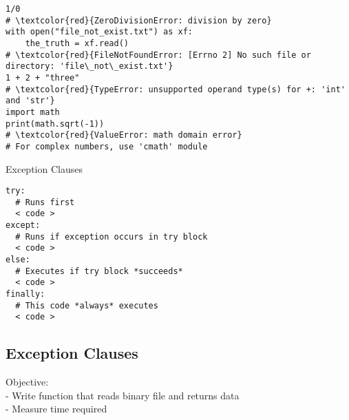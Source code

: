\documentclass{beamer}
\begin{document}
\begin{frame}[fragile]{}
\begin{verbatim}
1/0
# \textcolor{red}{ZeroDivisionError: division by zero}
with open("file_not_exist.txt") as xf:
    the_truth = xf.read()
# \textcolor{red}{FileNotFoundError: [Errno 2] No such file or directory: 'file\_not\_exist.txt'}
1 + 2 + "three"
# \textcolor{red}{TypeError: unsupported operand type(s) for +: 'int' and 'str'}
import math
print(math.sqrt(-1))
# \textcolor{red}{ValueError: math domain error}
# For complex numbers, use 'cmath' module
\end{verbatim}
\scriptsize{Exception Clauses}
\begin{verbatim}
try:
  # Runs first
  < code >
except:
  # Runs if exception occurs in try block
  < code >
else:
  # Executes if try block *succeeds*
  < code >
finally:
  # This code *always* executes
  < code >
\end{verbatim}
\end{frame}

\subsection{Exception Clauses}

\begin{frame}[fragile]{}
Objective:\\
- Write function that reads binary file and returns data\\
- Measure time required
\begin{verbatim}

\end{verbatim}
\end{frame}
\end{document}
